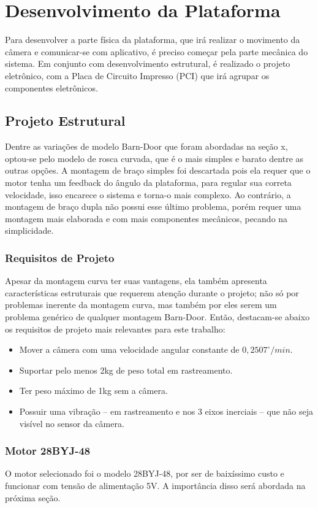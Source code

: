\chapter{Desenvolvimento da Plataforma}

Para desenvolver a parte física da plataforma, que irá realizar o movimento da câmera e comunicar-se com aplicativo, é preciso começar pela parte mecânica do sistema. Em conjunto com desenvolvimento estrutural, é realizado o projeto eletrônico, com a Placa de Circuito Impresso (PCI) que irá agrupar os componentes eletrônicos. 

\section{Projeto Estrutural}
Dentre as variações de modelo Barn-Door que foram abordadas na seção x, optou-se pelo modelo de rosca curvada, que é o mais simples e barato dentre as outras opções. A montagem de braço simples foi descartada pois ela requer que o motor tenha um feedback do ângulo da plataforma, para regular sua correta velocidade, isso encarece o sistema e torna-o mais complexo. Ao contrário, a montagem de braço dupla não possui esse último problema, porém requer uma montagem mais elaborada e com mais componentes mecânicos, pecando na simplicidade. 

\subsection{Requisitos de Projeto}
Apesar da montagem curva ter suas vantagens, ela também apresenta características estruturais que requerem atenção durante o projeto; não só por problemas inerente da montagem curva, mas também por eles serem um problema genérico de qualquer montagem Barn-Door. Então, destacam-se abaixo os requisitos de projeto mais relevantes para este trabalho:

\begin{itemize}
	\item Mover a câmera com uma velocidade angular constante de $ 0,2507^{\circ}/min $. 
	\item Suportar pelo menos 2kg de peso total em rastreamento. 
	\item Ter peso máximo de 1kg sem a câmera.
	\item Possuir uma vibração -- em rastreamento e nos 3 eixos inerciais -- que não seja visível no sensor da câmera.
\end{itemize}

\subsection{Motor 28BYJ-48}
O motor selecionado foi o modelo 28BYJ-48, por ser de baixíssimo custo e funcionar com tensão de alimentação 5V. A importância disso será abordada na próxima seção. 

